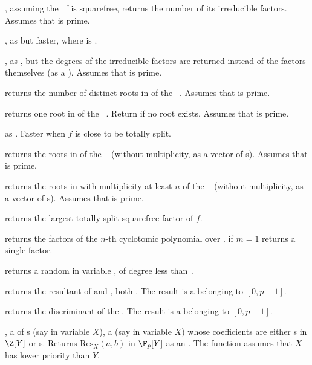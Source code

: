 , assuming the ~f is squarefree,
returns the number of its irreducible factors. Assumes that  is prime.

, as
 but faster,
where  is .

, as , but the
degrees of the irreducible factors are returned instead of the factors
themselves (as a ). Assumes that  is prime.

 returns the number of distinct
roots in  of the ~. Assumes that  is prime.

 returns one root in  of
the ~. Return  if no root exists.
Assumes that  is prime.

 as .
Faster when $f$ is close to be totally split.

 returns the roots in  of
the ~ (without multiplicity, as a vector of s).
Assumes that  is prime.

returns the roots in  with multiplicity at least $n$ of
the ~ (without multiplicity, as a vector of s).
Assumes that  is prime.

 returns the largest totally split
squarefree factor of $f$.

 returns the factors
of the $n$-th cyclotomic polynomial over . if $m=1$ returns
a single factor.

 returns a random 
in variable , of degree less than~.

 returns the resultant
of  and , both . The result is a 
belonging to $[0,p-1]$.

 returns the discriminant
of the  . The result is a  belonging to $[0,p-1]$.

,  a  of
s (say in variable $X$),  a  (say in variable $X$)
whose coefficients are either s in $\Z[Y]$ or s.
Returns $\text{Res}_X(a, b)$ in $\F_p[Y]$ as an . The function
assumes that $X$ has lower priority than $Y$.

